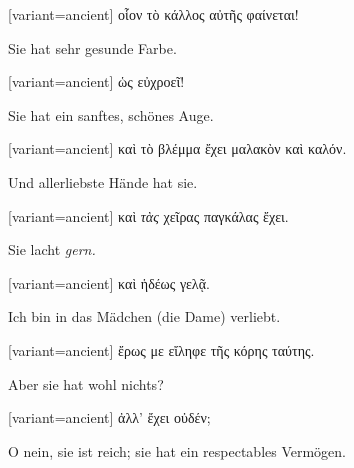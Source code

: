 \switchcolumn

\begin{greek}[variant=ancient]%
οἷον τὸ κάλλος αὐτῆς φαίνεται!

\end{greek}%
\switchcolumn*

Sie hat sehr gesunde Farbe. 

\switchcolumn

\begin{greek}[variant=ancient]%
ὡς εὐχροεῖ!

\end{greek}%
\switchcolumn*

Sie hat ein sanftes, schönes Auge. 

\switchcolumn

\begin{greek}[variant=ancient]%
καὶ τὸ βλέμμα ἔχει μαλακὸν καὶ καλόν.

\end{greek}%
\switchcolumn*

Und allerliebste Hände hat sie. 

\switchcolumn

\begin{greek}[variant=ancient]%
καὶ \emph{τὰς} χεῖρας παγκάλας ἔχει.

\end{greek}%
\switchcolumn*

Sie lacht \emph{gern.}

\switchcolumn

\begin{greek}[variant=ancient]%
καὶ ἡδέως γελᾷ.

\end{greek}%
\switchcolumn*

Ich bin in das Mädchen (die Dame) verliebt. 

\switchcolumn

\begin{greek}[variant=ancient]%
ἔρως με εἴληφε τῆς κόρης ταύτης.

\end{greek}%
\switchcolumn*

Aber sie hat wohl nichts? 

\switchcolumn

\begin{greek}[variant=ancient]%
ἀλλ' ἔχει οὐδέν;

\end{greek}%
\switchcolumn*

O nein, sie ist reich; sie hat ein respectables Vermögen. 


